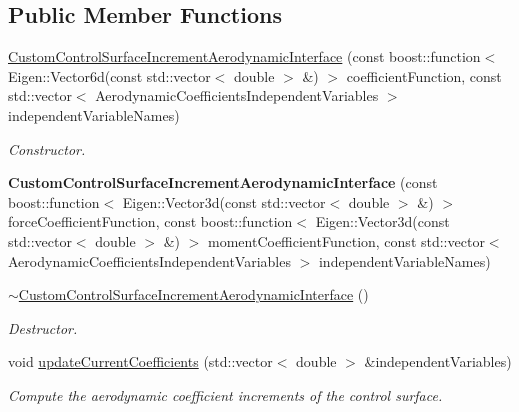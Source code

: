 \subsection*{Public Member Functions}
\begin{DoxyCompactItemize}
\item 
\hyperlink{classtudat_1_1aerodynamics_1_1CustomControlSurfaceIncrementAerodynamicInterface_abcad134bb8c9c51a5d39655a2eb13bd4}{Custom\+Control\+Surface\+Increment\+Aerodynamic\+Interface} (const boost\+::function$<$ Eigen\+::\+Vector6d(const std\+::vector$<$ double $>$ \&) $>$ coefficient\+Function, const std\+::vector$<$ Aerodynamic\+Coefficients\+Independent\+Variables $>$ independent\+Variable\+Names)
\begin{DoxyCompactList}\small\item\em Constructor. \end{DoxyCompactList}\item 
{\bfseries Custom\+Control\+Surface\+Increment\+Aerodynamic\+Interface} (const boost\+::function$<$ Eigen\+::\+Vector3d(const std\+::vector$<$ double $>$ \&) $>$ force\+Coefficient\+Function, const boost\+::function$<$ Eigen\+::\+Vector3d(const std\+::vector$<$ double $>$ \&) $>$ moment\+Coefficient\+Function, const std\+::vector$<$ Aerodynamic\+Coefficients\+Independent\+Variables $>$ independent\+Variable\+Names)\hypertarget{classtudat_1_1aerodynamics_1_1CustomControlSurfaceIncrementAerodynamicInterface_aedf1ad28203e5f8a1011b650da8a305b}{}\label{classtudat_1_1aerodynamics_1_1CustomControlSurfaceIncrementAerodynamicInterface_aedf1ad28203e5f8a1011b650da8a305b}

\item 
\hyperlink{classtudat_1_1aerodynamics_1_1CustomControlSurfaceIncrementAerodynamicInterface_af1a7104d7b3c2c3a15e7104697a61919}{$\sim$\+Custom\+Control\+Surface\+Increment\+Aerodynamic\+Interface} ()\hypertarget{classtudat_1_1aerodynamics_1_1CustomControlSurfaceIncrementAerodynamicInterface_af1a7104d7b3c2c3a15e7104697a61919}{}\label{classtudat_1_1aerodynamics_1_1CustomControlSurfaceIncrementAerodynamicInterface_af1a7104d7b3c2c3a15e7104697a61919}

\begin{DoxyCompactList}\small\item\em Destructor. \end{DoxyCompactList}\item 
void \hyperlink{classtudat_1_1aerodynamics_1_1CustomControlSurfaceIncrementAerodynamicInterface_a8c5c91fb0c3fb66e5b4a599f117a8ddc}{update\+Current\+Coefficients} (std\+::vector$<$ double $>$ \&independent\+Variables)
\begin{DoxyCompactList}\small\item\em Compute the aerodynamic coefficient increments of the control surface. \end{DoxyCompactList}\end{DoxyCompactItemize}
